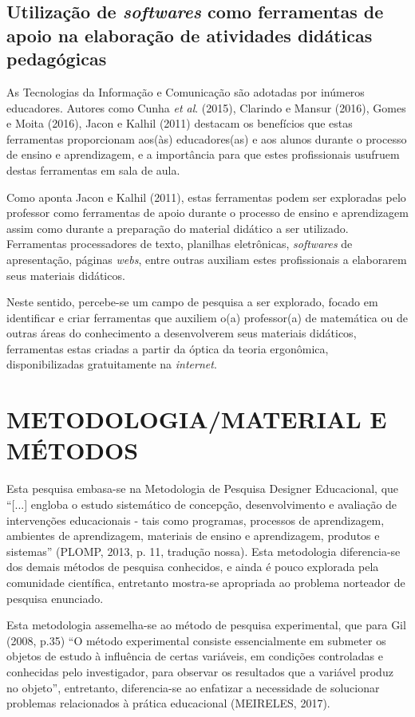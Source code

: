 \documentclass{IFNMG}
\begin{document}
\subsection{Utilização de \textit{softwares} como ferramentas de apoio na elaboração de atividades didáticas pedagógicas}
As Tecnologias da Informação e Comunicação são adotadas por inúmeros educadores. Autores como Cunha \textit{et al}. (2015), Clarindo e Mansur (2016), Gomes e Moita (2016), Jacon e Kalhil (2011) destacam os benefícios que estas ferramentas proporcionam aos(às) educadores(as) e aos alunos durante o processo de ensino e aprendizagem, e a importância para que estes profissionais usufruem destas ferramentas em sala de aula.

Como aponta Jacon e Kalhil (2011), estas ferramentas podem ser exploradas pelo professor como ferramentas de apoio durante o processo de ensino e aprendizagem assim como durante a preparação do material didático a ser utilizado. Ferramentas processadores de texto, planilhas eletrônicas, \textit{softwares} de apresentação, páginas \textit{webs}, entre outras auxiliam estes profissionais a elaborarem seus materiais didáticos.

Neste sentido, percebe-se um campo de pesquisa a ser explorado, focado em identificar e criar ferramentas que auxiliem o(a) professor(a) de matemática ou de outras áreas do conhecimento a desenvolverem seus materiais didáticos, ferramentas estas criadas a partir da óptica da teoria ergonômica, disponibilizadas gratuitamente na \textit{internet}.
\newpage
\section{METODOLOGIA/MATERIAL E MÉTODOS}
Esta pesquisa embasa-se na Metodologia de Pesquisa Designer Educacional, que “[...] engloba o estudo sistemático de concepção, desenvolvimento e avaliação de intervenções educacionais - tais como programas, processos de aprendizagem, ambientes de aprendizagem, materiais de ensino e aprendizagem, produtos e sistemas” (PLOMP, 2013, p. 11, tradução nossa). Esta metodologia diferencia-se dos demais métodos de pesquisa conhecidos, e ainda é pouco explorada pela comunidade científica, entretanto mostra-se apropriada ao problema norteador de pesquisa enunciado.

Esta metodologia assemelha-se ao método de pesquisa experimental, que para Gil (2008, p.35) “O método experimental consiste essencialmente em submeter os objetos de estudo à influência de certas variáveis, em condições controladas e conhecidas pelo investigador, para observar os resultados que a variável produz no objeto”, entretanto,  diferencia-se ao enfatizar a necessidade de solucionar problemas relacionados à prática educacional (MEIRELES, 2017).
\end{document}
